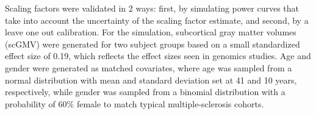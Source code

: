 Scaling factors were validated in 2 ways: first, by simulating power curves that take into account the uncertainty of the scaling factor estimate, and second, by a leave one out calibration. For the simulation, subcortical gray matter volumes (scGMV) were generated for two subject groups based on a small standardized effect size of 0.19, which reflects the effect sizes seen in genomics studies. Age and gender were generated as matched covariates, where age was sampled from a normal distribution with mean and standard deviation set at 41 and 10 years, respectively, while gender was sampled from a binomial distribution with a probability of 60\% female to match typical multiple-sclerosis cohorts. %